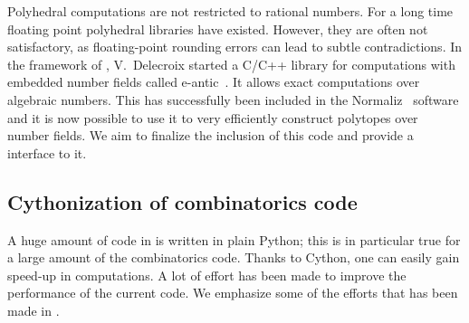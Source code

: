 \documentclass{deliverablereport}
\begin{document}
Polyhedral computations are not restricted to rational numbers. For a long time
floating point polyhedral libraries have existed. However, they are often not
satisfactory, as floating-point rounding errors can lead to subtle contradictions. In the framework
of \ODK, V.~Delecroix started a C/C++ library for computations with embedded
number fields called e-antic~\cite{eantic-code}. It allows exact computations
over algebraic numbers. This has successfully been included in the
Normaliz~\cite{normaliz-code} software and it is now possible to use
it to very efficiently construct polytopes over number fields. We aim to
finalize the inclusion of this code and provide a \Sage interface to it.


\subsection{Cythonization of combinatorics code}

A huge amount of code in \Sage is written in plain Python; this is in
particular true for a large amount of the combinatorics code. Thanks to
Cython, one can easily gain speed-up in computations. A lot of effort has
been made to improve the performance of the current code. We emphasize
some of the efforts that has been made in \ODK.
\end{document}
